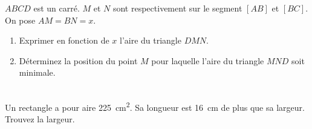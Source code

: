 \documentclass[main.tex]{subfiles}
\begin{document}
\begin{exercise}\label{chapter03:exercise:modelisation08} \hfill 
	
\noindent
\parbox{0.6\linewidth}{
$ABCD$ est un carré. $M$ et $N$ sont respectivement sur le segment $[AB]$ et $[BC]$. On pose $AM=BN=x$.

\begin{enumerate}[label=\alph*), leftmargin=*]
	\item Exprimer en fonction de $x$ l'aire du triangle $DMN$. 
	\item Déterminez la position du point $M$ pour laquelle l'aire du triangle $MND$ soit minimale.
\end{enumerate}  
}\hfill
\parbox{0.35\linewidth}{	 
}
	
	
\end{exercise}
\begin{exercise}\label{chapter03:exercise:modelisation09}  \hfill \\
	Un   rectangle a pour aire \SI{225}{\centi\meter^2}. Sa longueur est \SI{16}{\centi\meter} de plus que sa largeur. Trouvez la largeur.
\end{exercise} 





\end{document}
